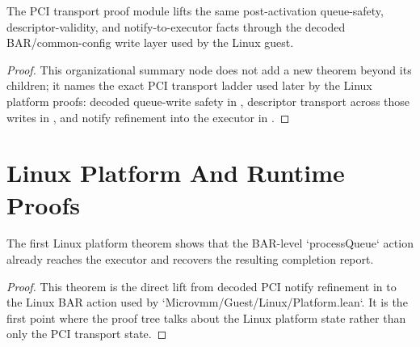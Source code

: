\begin{theorem}
\label{thm:pci-transport}
\leanok
The PCI transport proof module lifts the same post-activation queue-safety, descriptor-validity, and notify-to-executor facts through the decoded BAR/common-config write layer used by the Linux guest.
\end{theorem}

\begin{proof}
\leanok
{}
This organizational summary node does not add a new theorem beyond its children; it names the exact PCI transport ladder used later by the Linux platform proofs: decoded queue-write safety in , descriptor transport across those writes in , and notify refinement into the executor in .
\end{proof}

\section{Linux Platform And Runtime Proofs}

\begin{theorem}
\label{thm:linux-bar-action}
\leanok
The first Linux platform theorem shows that the BAR-level `processQueue` action already reaches the executor and recovers the resulting completion report.
\end{theorem}

\begin{proof}
\leanok
{}
This theorem is the direct lift from decoded PCI notify refinement in  to the Linux BAR action used by `Microvmm/Guest/Linux/Platform.lean`.
It is the first point where the proof tree talks about the Linux platform state rather than only the PCI transport state.
\end{proof}

